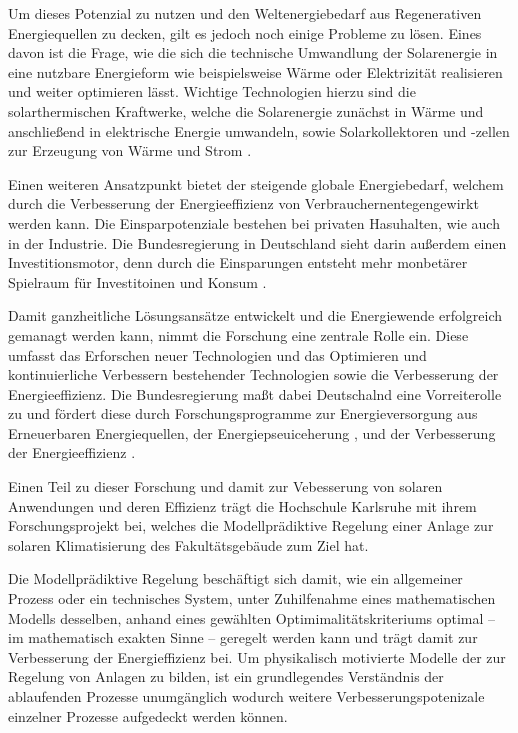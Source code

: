 Um dieses Potenzial zu nutzen und den Weltenergiebedarf aus Regenerativen Energiequellen zu decken, gilt es jedoch noch einige Probleme zu lösen. Eines davon ist die Frage, wie die sich die technische Umwandlung der Solarenergie in eine nutzbare Energieform wie beispielsweise Wärme oder Elektrizität realisieren und weiter optimieren lässt. Wichtige Technologien hierzu sind die solarthermischen Kraftwerke, welche die Solarenergie zunächst in Wärme und anschließend in elektrische Energie umwandeln, sowie Solarkollektoren und -zellen zur Erzeugung von Wärme und Strom \cite[S.~34ff.]{qu11}.

Einen weiteren Ansatzpunkt bietet der steigende globale Energiebedarf, welchem durch die Verbesserung der Energieeffizienz von Verbrauchernentegengewirkt werden kann. Die Einsparpotenziale bestehen bei privaten Hasuhalten, wie auch in der Industrie. Die Bundesregierung in Deutschland sieht darin außerdem einen Investitionsmotor, denn durch die Einsparungen entsteht mehr monbetärer Spielraum für Investitoinen und Konsum \cite[S.~2]{bi15}.


Damit ganzheitliche Lösungsansätze entwickelt und die Energiewende erfolgreich gemanagt werden kann, nimmt die Forschung eine zentrale Rolle ein. Diese umfasst das Erforschen neuer Technologien und das Optimieren und kontinuierliche Verbessern bestehender Technologien sowie die Verbesserung der Energieeffizienz. Die Bundesregierung maßt dabei Deutschalnd eine Vorreiterolle zu und fördert diese durch Forschungsprogramme zur Energieversorgung aus Erneuerbaren Energiequellen, der Energiepseuiceherung , und der Verbesserung der Energieeffizienz \cite[S.~11]{bi15}.

 
Einen Teil zu dieser Forschung und damit zur Vebesserung von solaren Anwendungen und deren Effizienz trägt die Hochschule Karlsruhe mit ihrem Forschungsprojekt bei, welches die Modellprädiktive Regelung einer Anlage zur solaren Klimatisierung des Fakultätsgebäude zum Ziel hat.

Die Modellprädiktive Regelung beschäftigt sich damit, wie ein allgemeiner Prozess oder ein technisches System, unter Zuhilfenahme eines mathematischen Modells desselben, anhand eines gewählten Optimimalitätskriteriums optimal -- im mathematisch exakten Sinne -- geregelt werden kann und trägt damit zur Verbesserung der Energieffizienz bei. Um  physikalisch motivierte Modelle der zur Regelung von Anlagen zu bilden, ist ein grundlegendes Verständnis der ablaufenden Prozesse unumgänglich wodurch weitere Verbesserungspotenizale einzelner Prozesse aufgedeckt werden können.

